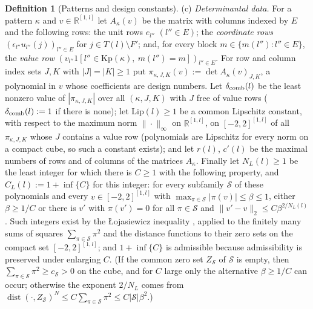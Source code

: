 \documentclass[10pt]{amsart}
\theoremstyle{definition}
\newtheorem{definition}[theorem]{Definition}
\theoremstyle{remark}
\newcommand{\dist}{\operatorname{dist}}
\newcommand{\R}{\mathbb R}
\begin{document}
\begin{definition}[Patterns and design constants]
\textup{(c)} \emph{Determinantal data.}  For a pattern $\kappa$ and
$v\in\R^{[1,l]}$ let $A_\kappa(v)$ be the matrix with columns indexed by
$E$ and the following rows: the unit rows $e_{l''}$ $(l''\in E)$; the
\emph{coordinate rows} $(\epsilon_{l''}u_{l''}(j))_{l''\in E}$ for
$j\in T(l)\setminus F'$; and, for every block $m\in\{m(l''):l''\in E\}$,
the \emph{value row} $(v_{l''}1[l''\in\mathrm{Kp}(\kappa),\
m(l'')=m])_{l''\in E}$.  For row and column index sets $J,K$ with
$|J|=|K|\ge1$ put $\pi_{\kappa,J,K}(v):=\det A_\kappa(v)_{J,K}$, a
polynomial in $v$ whose coefficients are design numbers.  Let
$\delta_{\rm comb}(l)$ be the least nonzero value of
$|\pi_{\kappa,J,K}|$ over all $(\kappa,J,K)$ with $J$ free of value rows
($\delta_{\rm comb}(l):=1$ if there is none); let $\mathrm{Lip}(l)\ge1$ be
a common Lipschitz constant, with respect to the maximum norm
$\|\cdot\|_\infty$ on $\R^{[1,l]}$, on $[-2,2]^{[1,l]}$ of all
$\pi_{\kappa,J,K}$ whose $J$ contains a value row (polynomials are Lipschitz
for every norm on a compact cube, so such a constant exists); and let $r(l)$, $c'(l)$ be the maximal
numbers of rows and of columns of the matrices $A_\kappa$.  Finally let
$N_L(l)\ge1$ be the least integer for which there is $C\ge1$ with the
following property, and $C_L(l):=1+\inf\{C\}$ for this integer: for every
subfamily $\mathcal S$ of these polynomials and every
$v\in[-2,2]^{[1,l]}$ with $\max_{\pi\in\mathcal S}|\pi(v)|\le\beta\le1$,
either $\beta\ge1/C$ or there is $v'$ with $\pi(v')=0$ for all
$\pi\in\mathcal S$ and $\|v'-v\|_2\le C\beta^{2/N_L(l)}$.  Such integers
exist by the {\L}ojasiewicz inequality \cite[Corollary~2.6.7]{BCR}, applied to the finitely many sums
of squares $\sum_{\pi\in\mathcal S}\pi^2$ and the distance functions to
their zero sets on the compact set $[-2,2]^{[1,l]}$; and $1+\inf\{C\}$ is
admissible because admissibility is preserved under enlarging $C$.  (If
the common zero set $Z_{\mathcal S}$ of $\mathcal S$ is empty, then
$\sum_{\pi\in\mathcal S}\pi^2\ge c_{\mathcal S}>0$ on the cube, and for $C$
large only the alternative $\beta\ge1/C$ can occur; otherwise the exponent
$2/N_L$ comes from $\dist(\cdot,Z_{\mathcal S})^{N}\le C\sum_{\pi\in
\mathcal S}\pi^2\le C|\mathcal S|\beta^2$.)


\end{definition}
\end{document}
